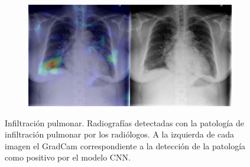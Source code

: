 \begin{figure}[b]
\begin{subfigure}{0.4\textwidth}
    \end{subfigure}
    \begin{subfigure}{0.4\textwidth}
        \centering
        \includegraphics[width=1.0\textwidth]{Chapters/5. Conclusiones/img/Infiltration/1_1_00022215_012.png}
    \end{subfigure}

    \caption[short]{Infiltración pulmonar. Radiografías detectadas con la patología de infiltración pulmonar por los
                    radiólogos. A la izquierda de cada imagen el GradCam correspondiente a la detección
                    de la patología como positivo por el modelo CNN.}
\end{figure}

